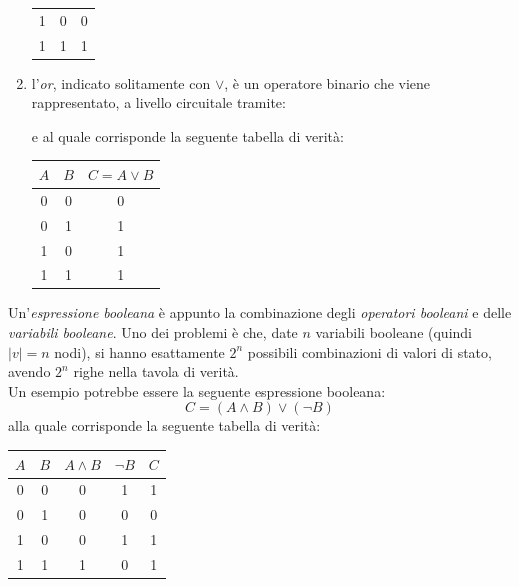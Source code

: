 \documentclass[a4paper,12pt, oneside]{book}
\begin{document}
\begin{enumerate}
\begin{table}[H]
\begin{tabular}{c|c|c}
      1 & 0 & 0\\
      1 & 1 & 1 
    \end{tabular}
  \end{table}
  \item l'\textit{or}, indicato solitamente con $\lor$, è un operatore binario
  che viene rappresentato, a livello circuitale tramite:
  \begin{center}
  \end{center}
  e al quale corrisponde la seguente tabella di verità:
  \begin{table}[H]
    \small
    \centering
    \begin{tabular}{c|c|c}
      $A$&$B$&$C=A\lor B$\\
      \hline
      0 & 0 & 0 \\
      0 & 1 & 1\\
      1 & 0 & 1\\
      1 & 1 & 1 
    \end{tabular}
  \end{table}
\end{enumerate}
Un'\textit{espressione booleana} è appunto la combinazione degli
\textit{operatori booleani} e delle \textit{variabili booleane}. Uno dei
problemi è che, date $n$ variabili booleane (quindi $|v|=n$ nodi), si hanno
esattamente $2^n$ possibili combinazioni di valori di stato, avendo $2^n$ righe
nella tavola di verità.\\
Un esempio potrebbe essere la seguente espressione booleana:
\[C=(A\land B)\lor (\neg B)\]
alla quale corrisponde la seguente tabella di verità:
\begin{table}[H]
  \small
  \centering
  \begin{tabular}{c|c|c|c|c}
    $A$&$B$&$A\land B$ & $\neg B$ & $C$\\
    \hline
    0 & 0 & 0 & 1 & 1\\
    0 & 1 & 0 & 0 & 0\\
    1 & 0 & 0 & 1 & 1\\
    1 & 1 & 1 & 0 & 1
  \end{tabular}
\end{table}
\end{document}
